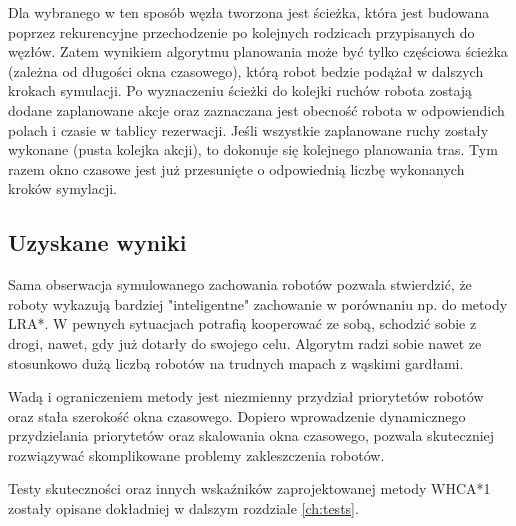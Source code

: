 Dla wybranego w ten sposób węzła tworzona jest ścieżka, która jest budowana poprzez rekurencyjne przechodzenie po kolejnych rodzicach przypisanych do węzłów.
Zatem wynikiem algorytmu planowania może być tylko częściowa ścieżka (zależna od długości okna czasowego), którą robot bedzie podążał w dalszych krokach symulacji.
Po wyznaczeniu ścieżki do kolejki ruchów robota zostają dodane zaplanowane akcje oraz zaznaczana jest obecność robota w odpowiendich polach i czasie w tablicy rezerwacji.
Jeśli wszystkie zaplanowane ruchy zostały wykonane (pusta kolejka akcji), to dokonuje się kolejnego planowania tras.
Tym razem okno czasowe jest już przesunięte o odpowiednią liczbę wykonanych kroków symylacji.

\subsection{Uzyskane wyniki} %
Sama obserwacja symulowanego zachowania robotów pozwala stwierdzić, że roboty wykazują bardziej "inteligentne" zachowanie w porównaniu np. do metody LRA*. W pewnych sytuacjach potrafią kooperować ze sobą, schodzić sobie z drogi, nawet, gdy już dotarły do swojego celu.
Algorytm radzi sobie nawet ze stosunkowo dużą liczbą robotów na trudnych mapach z wąskimi gardłami.


Wadą i ograniczeniem metody jest niezmienny przydział priorytetów robotów oraz stała szerokość okna czasowego.
Dopiero wprowadzenie dynamicznego przydzielania priorytetów oraz skalowania okna czasowego, pozwala skuteczniej rozwiązywać skomplikowane problemy zakleszczenia robotów.

Testy skuteczności oraz innych wskaźników zaprojektowanej metody WHCA*1 zostały opisane dokładniej w dalszym rozdziale \ref{ch:tests}.
